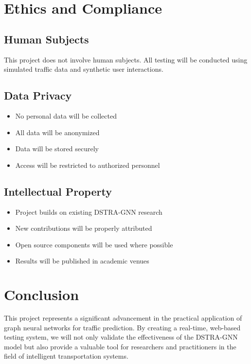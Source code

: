 \documentclass[12pt,a4paper]{article}
\begin{document}
\section{Ethics and Compliance}

\subsection{Human Subjects}

This project does not involve human subjects. All testing will be conducted using simulated traffic data and synthetic user interactions.

\subsection{Data Privacy}

\begin{itemize}
    \item No personal data will be collected
    \item All data will be anonymized
    \item Data will be stored securely
    \item Access will be restricted to authorized personnel
\end{itemize}

\subsection{Intellectual Property}

\begin{itemize}
    \item Project builds on existing DSTRA-GNN research
    \item New contributions will be properly attributed
    \item Open source components will be used where possible
    \item Results will be published in academic venues
\end{itemize}

\section{Conclusion}

This project represents a significant advancement in the practical application of graph neural networks for traffic prediction. By creating a real-time, web-based testing system, we will not only validate the effectiveness of the DSTRA-GNN model but also provide a valuable tool for researchers and practitioners in the field of intelligent transportation systems.
\end{document}
